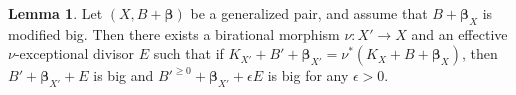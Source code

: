 \documentclass[11pt]{amsart}
\numberwithin{equation}{section}
\def\bbeta{\boldsymbol{\beta}}
\theoremstyle{definition}
\theoremstyle{definition}
\newtheorem{lemma}[theorem]{Lemma}
\theoremstyle{definition}
\begin{document}



\begin{lemma}\label{l-modnef}
Let $(X,B+\bbeta)$ be a generalized pair, and assume that $B+\bbeta_X$ is modified big. Then there exists a birational morphism $\nu :X'\to X$ and an effective $\nu$-exceptional divisor $E$ such that if $K_{X'}+B'+\bbeta _{X'}=\nu ^*(K_X+B+\bbeta _X)$, then $B'+\bbeta_{X'} + E$ is big and $B'^{\geq 0}+\bbeta_{X'} +\epsilon E$ is big for any $\epsilon >0$. 
\end{lemma}
\end{document}
